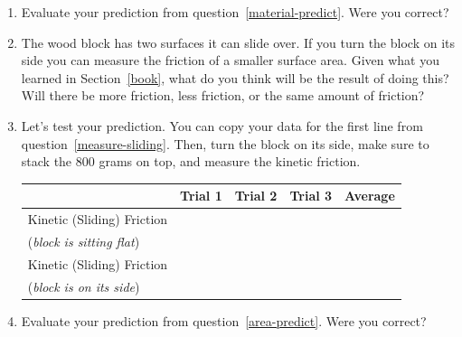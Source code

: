 \documentclass[10pt]{exam}
\begin{document}
\begin{enumerate}
  \item 
    Evaluate your prediction from question~\ref{material-predict}.  Were you correct?
    \vs 

 \item \label{area-predict}
    The wood block has two surfaces it can slide over.  If you turn the block on its side you can measure the friction of a smaller surface area. Given what you learned in Section~\ref{book}, what do you think will be the result of doing this? Will there be more friction, less friction, or the same amount of friction?
    \vs 

  \item 
    Let's test your prediction.  You can copy your data for the first line from question~\ref{measure-sliding}.  Then, turn the block on its side, make sure to stack the 800 grams on top, and measure the kinetic friction.

    \begin{tabular}{|p{12em}
      *3{|>{\centering\arraybackslash}m{.1\textwidth}}
      ||>{\centering\arraybackslash}m{.1\textwidth}|}
      \hline
      & Trial 1 & Trial 2 & Trial 3 & Average \\\hline
        Kinetic (Sliding) Friction &&&& \\
        (\emph{block is sitting flat}) &&&& \\\hline
        Kinetic (Sliding) Friction &&&& \\
        (\emph{block is on its side}) &&&& \\\hline
    \end{tabular}

  \item 
    Evaluate your prediction from question~\ref{area-predict}.  Were you correct?
    \vs 
\end{enumerate}
\end{document}
